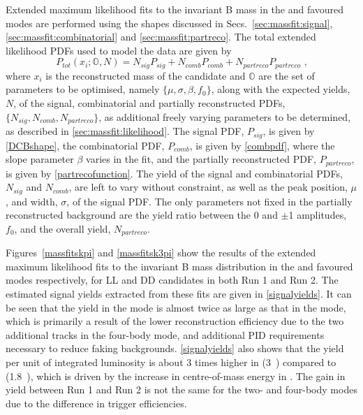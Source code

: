 Extended maximum likelihood fits to the invariant B mass in the \kpi and \kpipipi favoured modes are performed using the shapes discussed in Secs.~\ref{sec:massfit:signal}, \ref{sec:massfit:combinatorial} and \ref{sec:massfit:partreco}. The total extended likelihood PDFs used to model the data are given by
\begin{equation}
P_{tot}(x_i;\mathbb{O}, N) = N_{sig}P_{sig} + N_{comb}P_{comb} + N_{partreco}P_{partreco} \text{ ,}
\label{totalpdf}
\end{equation}
where $x_i$ is the reconstructed \Bm mass of the candidate and $\mathbb{O}$ are the set of parameters to be optimised, namely $\{\mu, \sigma, \beta, f_0\}$, along with the expected yields, $N$, of the signal, combinatorial and partially reconstructed PDFs, $\{N_{sig}, N_{comb}, N_{partreco}\}$, as additional freely varying parameters to be determined, as described in \sect\ref{sec:massfit:likelihood}. The signal PDF, $P_{sig}$, is given by \eqn\ref{DCBshape}, the combinatorial PDF, $P_{comb}$, is given by \eqn\ref{combpdf}, where the slope parameter $\beta$ varies in the fit, and the partially reconstructed PDF, $P_{partreco}$, is given by \eqn\ref{partrecofunction}. The yield of the signal and combinatorial PDFs, $N_{sig}$ and $N_{comb}$, are left to vary without constraint, as well as the peak position, $\mu$, and width, $\sigma$, of the signal PDF. The only parameters not fixed in the partially reconstructed background are the yield ratio between the 0 and $\pm$1 amplitudes, $f_0$, and the overall yield, $N_{partreco}$.

Figures~\ref{massfitskpi} and \ref{massfitsk3pi} show the results of the extended maximum likelihood fits to the invariant B mass distribution in the \kpi and \kpipipi favoured modes respectively, for LL and DD candidates in both Run 1 and Run 2. The estimated signal yields extracted from these fits are given in \tab\ref{signalyields}. It can be seen that the yield in the \kpi mode is almost twice as large as that in the \kpipipi mode, which is primarily a result of the lower reconstruction efficiency due to the two additional tracks in the four-body mode, and additional PID requirements necessary to reduce faking backgrounds. \Tab\ref{signalyields} also shows that the yield per unit of integrated luminosity is about 3 times higher in \runone (3~\invfb) compared to \runtwo (1.8~\invfb), which is driven by the increase in centre-of-mass energy in \runtwo. The gain in yield between Run 1 and Run 2 is not the same for the two- and four-body modes due to the difference in trigger efficiencies.

